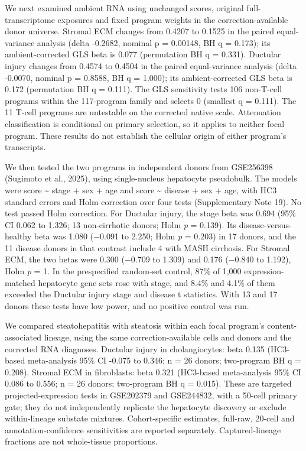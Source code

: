We next examined ambient RNA using unchanged scores, original full-transcriptome exposures and fixed program weights in the correction-available donor universe. Stromal ECM changes from 0.4207 to 0.1525 in the paired equal-variance analysis (delta -0.2682, nominal p = 0.00148, BH q = 0.173); its ambient-corrected GLS beta is 0.077 (permutation BH q = 0.331). Ductular injury changes from 0.4574 to 0.4504 in the paired equal-variance analysis (delta -0.0070, nominal p = 0.8588, BH q = 1.000); its ambient-corrected GLS beta is 0.172 (permutation BH q = 0.111). The GLS sensitivity tests 106 non-T-cell programs within the 117-program family and selects 0 (smallest q = 0.111). The 11 T-cell programs are untestable on the corrected native scale. Attenuation classification is conditional on primary selection, so it applies to neither focal program. These results do not establish the cellular origin of either program's transcripts.

We then tested the two programs in independent donors from GSE256398 (Sugimoto et al., 2025), using single-nucleus hepatocyte pseudobulk. The models were score \textasciitilde{} stage + sex + age and score \textasciitilde{} disease + sex + age, with HC3 standard errors and Holm correction over four tests (Supplementary Note 19). No test passed Holm correction. For Ductular injury, the stage beta was 0.694 (95\% CI 0.062 to 1.326; 13 non-cirrhotic donors; Holm \emph{p} = 0.139). Its disease-versus-healthy beta was 1.080 (−0.091 to 2.250; Holm \emph{p} = 0.203) in 17 donors, and the 11 disease donors in that contrast include 4 with MASH cirrhosis. For Stromal ECM, the two betas were 0.300 (−0.709 to 1.309) and 0.176 (−0.840 to 1.192), Holm \emph{p} = 1. In the prespecified random-set control, 87\% of 1,000 expression-matched hepatocyte gene sets rose with stage, and 8.4\% and 4.1\% of them exceeded the Ductular injury stage and disease t statistics. With 13 and 17 donors these tests have low power, and no positive control was run.

We compared steatohepatitis with steatosis within each focal program's content-associated lineage, using the same correction-available cells and donors and the corrected RNA diagnoses. Ductular injury in cholangiocytes: beta 0.135 (HC3-based meta-analysis 95\% CI -0.075 to 0.346; n = 26 donors; two-program BH q = 0.208). Stromal ECM in fibroblasts: beta 0.321 (HC3-based meta-analysis 95\% CI 0.086 to 0.556; n = 26 donors; two-program BH q = 0.015). These are targeted projected-expression tests in GSE202379 and GSE244832, with a 50-cell primary gate; they do not independently replicate the hepatocyte discovery or exclude within-lineage substate mixtures. Cohort-specific estimates, full-raw, 20-cell and annotation-confidence sensitivities are reported separately. Captured-lineage fractions are not whole-tissue proportions.

